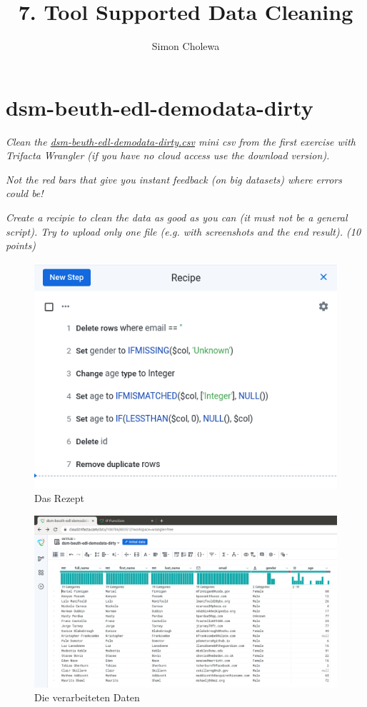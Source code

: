 \documentclass[11pt,a4paper]{article}
\author{Simon Cholewa}
\title{7. Tool Supported Data Cleaning}
\begin{document}
\maketitle

\section{dsm-beuth-edl-demodata-dirty}

\textit{Clean the \hyperref{https://raw.githubusercontent.com/edlich/eternalrepo/master/DS-WAHLFACH/dsm-beuth-edl-demodata-dirty.csv}{}{}{dsm-beuth-edl-demodata-dirty.csv} mini csv from the first exercise with Trifacta Wrangler (if you have no cloud access use the download version).}

\textit{Not the red bars that give you instant feedback (on big datasets) where errors could be!}

\textit{Create a recipie to clean the data as good as you can (it must not be a general script). Try to upload only one file (e.g. with screenshots and the end result). (10 points)}

\begin{figure}[H]
	\centering
	\includegraphics[width=0.8\linewidth]{images/recipe}
	\caption[Das Rezept]{Das Rezept}
	\label{fig:recipe}
\end{figure}

\begin{figure}[H]
	\centering
	\includegraphics[width=1\linewidth]{images/wrangled_data}
	\caption[Die verarbeiteten Daten]{Die verarbeiteten Daten}
	\label{fig:wrangleddata}
\end{figure}
\end{document}
